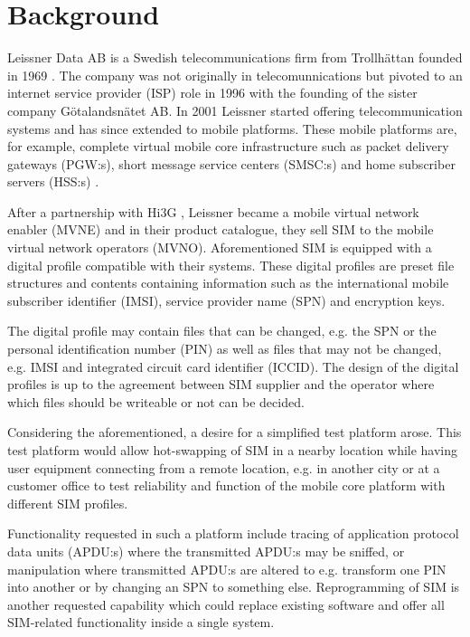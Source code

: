 \section{Background}

Leissner Data AB is a Swedish telecommunications firm from
Trollhättan founded in 1969 \cite{leissner-about}. The company
was not originally in telecomunnications but pivoted to an 
internet service provider (ISP) role in 1996 with the founding of
the sister company Götalandsnätet AB. In 2001 Leissner started
offering telecommunication systems and has since extended to mobile
platforms. These mobile platforms are, for example, complete
virtual mobile core infrastructure such as packet delivery
gateways (PGW:s), short message service centers (SMSC:s) and home
subscriber servers (HSS:s) \cite{leissner-mobile-core}.

After a partnership with Hi3G \cite{leissner-about}, Leissner
became a mobile virtual network enabler (MVNE) and in their
product catalogue, they sell SIM to the mobile virtual network
operators (MVNO). Aforementioned SIM is equipped with a digital
profile compatible with their systems. These digital profiles are
preset file structures and contents containing information such
as the international mobile subscriber identifier (IMSI), service
provider name (SPN) and encryption keys.

The digital profile may contain files that can be changed, e.g.
the SPN or the personal identification number (PIN) as well as
files that may not be changed, e.g. IMSI and integrated circuit
card identifier (ICCID). The design of the digital profiles is up
to the agreement between SIM supplier and the operator where which
files should be writeable or not can be decided.
\cite{Are smart card applications akin to profiles or are they something else?}

Considering the aforementioned, a desire for a simplified test
platform arose. This test platform would allow hot-swapping of
SIM in a nearby location while having user equipment connecting
from a remote location, e.g. in another city or at a customer
office to test reliability and function of the mobile core
platform with different SIM profiles.

Functionality requested in such a platform include tracing of
application protocol data units (APDU:s) where the transmitted
APDU:s may be sniffed, or manipulation where transmitted APDU:s
are altered to e.g. transform one PIN into another or by changing
an SPN to something else. Reprogramming of SIM is another
requested capability which could replace existing software and
offer all SIM-related functionality inside a single system.

